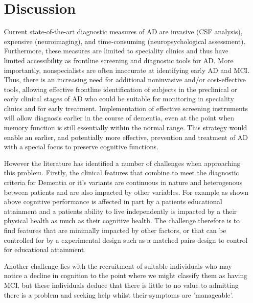 \documentclass[10pt, letterpaper, twoside, openany]{book}
\begin{document}
\section{Discussion}
Current state-of-the-art diagnostic measures of AD are invasive (CSF analysis), expensive (neuroimaging), and time-consuming (neuropsychological assessment). Furthermore, these measures are limited to speciality clinics and thus have limited accessibility as frontline screening and diagnostic tools for AD. More importantly, nonspecialists are often inaccurate at identifying early AD and MCI. Thus, there is an increasing need for additional noninvasive and/or cost-effective tools, allowing effective frontline identification of subjects in the preclinical or early clinical stages of AD who could be suitable for monitoring in speciality clinics and for early treatment. Implementation of effective screening instruments will allow diagnosis earlier in the course of dementia, even at the point when memory function is still essentially within the normal range. This strategy would enable an earlier, and potentially more effective, prevention and treatment of AD with a special focus to preserve cognitive functions.
\par 
However the literature has identified a number of challenges when approaching this problem. Firstly, the clinical features that combine to meet the diagnostic criteria for Dementia or it's variants are continuous in nature and heterogenous between patients and are also impacted by other variables. For example as shown above cognitive performance is affected in part by a patients educational attainment and a patients ability to live independently is impacted by a their physical health as much as their cognitive health. The challenge therefore is to find features that are minimally impacted by other factors, or that can be controlled for by a experimental design such as a matched pairs design to control for educational attainment.
\par 
Another challenge lies with the recruitment of suitable individuals who may notice a decline in cognition to the point where we might classify them as having MCI, but these individuals deduce that there is little to no value to admitting there is a problem and seeking help whilst their symptoms are 'manageable'.
\par
\end{document}
